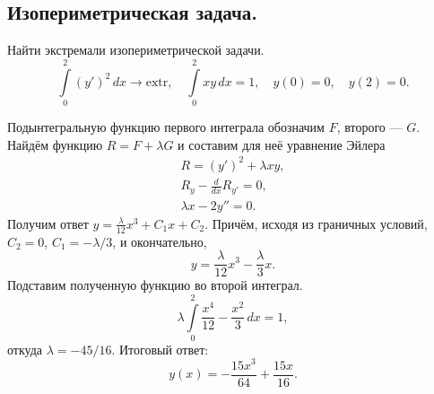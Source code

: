 \subsection{Изопериметрическая задача.}
\begin{example}
  Найти экстремали изопериметрической задачи.  
  \[
    \int\limits_{0}^{2} (y')^2\,dx \to \mathrm{extr}, \quad
    \int\limits_{0}^{2} xy\,dx = 1, \quad
    y(0) = 0, \quad
    y(2) = 0.
  \]
  
\begin{solution}
  Подынтегральную функцию первого интеграла обозначим $ F $, второго --- $ G $.
  Найдём функцию $ R = F + \lambda G $ и составим для неё уравнение Эйлера
  \begin{gather*}
      R= (y')^2 + \lambda xy,\\
      R_y - \frac{d}{dx} R_{y'} = 0,\\
      \lambda x - 2y'' = 0.
  \end{gather*}
Получим ответ $ y = \frac{\lambda}{12} x^3 + C_1 x + C_2 $. Причём, исходя из
граничных условий, $ C_2 = 0 $, $ C_1 = - \lambda/3 $, и окончательно,  
\[
    y = \frac{\lambda}{12}x^3 - \frac{\lambda}{3} x.
\]
Подставим полученную функцию во второй интеграл.  
\[
  \lambda\int\limits_{0}^{2}\frac{x^4}{12} - \frac{x^2}{3}\,dx = 1,
\]
откуда $ \lambda = -45/16 $. Итоговый ответ: 
\[
    \boxed{
      y(x) = - \frac{15 x^{3}}{64} + \frac{15 x}{16}.
    }
\]

\end{solution}
\end{example}

